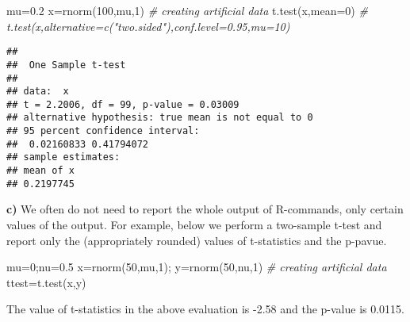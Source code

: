 \documentclass[
  11pt,
]{article}
\newenvironment{Shaded}{\begin{snugshade}}{\end{snugshade}}
\newcommand{\AttributeTok}[1]{\textcolor[rgb]{0.77,0.63,0.00}{#1}}
\newcommand{\CommentTok}[1]{\textcolor[rgb]{0.56,0.35,0.01}{\textit{#1}}}
\newcommand{\DecValTok}[1]{\textcolor[rgb]{0.00,0.00,0.81}{#1}}
\newcommand{\FloatTok}[1]{\textcolor[rgb]{0.00,0.00,0.81}{#1}}
\newcommand{\FunctionTok}[1]{\textcolor[rgb]{0.00,0.00,0.00}{#1}}
\newcommand{\NormalTok}[1]{#1}
\newcommand{\OtherTok}[1]{\textcolor[rgb]{0.56,0.35,0.01}{#1}}
\begin{document}
\begin{Shaded}
\begin{Highlighting}[]
\NormalTok{mu}\OtherTok{=}\FloatTok{0.2}
\NormalTok{x}\OtherTok{=}\FunctionTok{rnorm}\NormalTok{(}\DecValTok{100}\NormalTok{,mu,}\DecValTok{1}\NormalTok{) }\CommentTok{\# creating artificial data}
\FunctionTok{t.test}\NormalTok{(x,}\AttributeTok{mean=}\DecValTok{0}\NormalTok{)   }\CommentTok{\# t.test(x,alternative=c("two.sided"),conf.level=0.95,mu=10)}
\end{Highlighting}
\end{Shaded}

\begin{verbatim}
## 
##  One Sample t-test
## 
## data:  x
## t = 2.2006, df = 99, p-value = 0.03009
## alternative hypothesis: true mean is not equal to 0
## 95 percent confidence interval:
##  0.02160833 0.41794072
## sample estimates:
## mean of x 
## 0.2197745
\end{verbatim}

\textbf{c)} We often do not need to report the whole output of
R-commands, only certain values of the output. For example, below we
perform a two-sample t-test and report only the (appropriately rounded)
values of t-statistics and the p-pavue.

\begin{Shaded}
\begin{Highlighting}[]
\NormalTok{mu}\OtherTok{=}\DecValTok{0}\NormalTok{;nu}\OtherTok{=}\FloatTok{0.5}
\NormalTok{x}\OtherTok{=}\FunctionTok{rnorm}\NormalTok{(}\DecValTok{50}\NormalTok{,mu,}\DecValTok{1}\NormalTok{); y}\OtherTok{=}\FunctionTok{rnorm}\NormalTok{(}\DecValTok{50}\NormalTok{,nu,}\DecValTok{1}\NormalTok{) }\CommentTok{\# creating artificial data}
\NormalTok{ttest}\OtherTok{=}\FunctionTok{t.test}\NormalTok{(x,y) }
\end{Highlighting}
\end{Shaded}

The value of t-statistics in the above evaluation is -2.58 and the
p-value is 0.0115.
\end{document}
